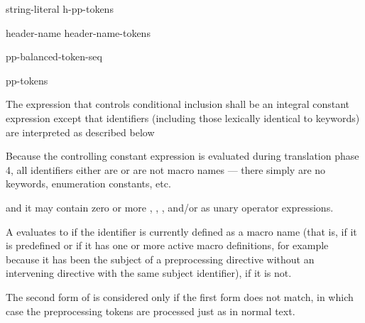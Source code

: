 \begin{bnf}
\br
    string-literal\br
    \terminal{<} h-pp-tokens \terminal{>}
\end{bnf}

%
\begin{bnf}
\br
     \terminal{(} header-name \terminal{)}\br
     \terminal{(} header-name-tokens \terminal{)}
\end{bnf}

%
\begin{bnf}
\br
     \terminal{(} pp-balanced-token-seq \terminal{)}
\end{bnf}

%
\begin{bnf}
\br
     pp-tokens \terminal{)}
\end{bnf}

\pnum
The expression that controls conditional inclusion
shall be an integral constant expression except that
identifiers
(including those lexically identical to keywords)
are interpreted as described below
\begin{footnote}
Because the controlling constant expression is evaluated
during translation phase 4,
all identifiers either are or are not macro names ---
there simply are no keywords, enumeration constants, etc.
\end{footnote}
and it may contain zero or more ,
,
, and/or
 as unary operator expressions.

\pnum
A  evaluates to 
if the identifier is currently defined
as a macro name
(that is, if it is predefined
or if it has one or more active macro definitions,
for example because
it has been the subject of a
preprocessing directive
without an intervening
directive with the same subject identifier),  if it is not.

\pnum
The second form of 
is considered only if the first form does not match,
in which case the preprocessing tokens are processed just as in normal text.

